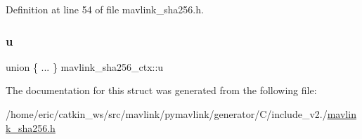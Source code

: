 Definition at line 54 of file mavlink\+\_\+sha256.\+h.

\mbox{\label{structmavlink__sha256__ctx_aac47c20ac74d2755bf35047563645135}} 
\subsubsection{\texorpdfstring{u}{u}}
{\footnotesize\ttfamily union \{ ... \}   mavlink\+\_\+sha256\+\_\+ctx\+::u}



The documentation for this struct was generated from the following file\+:\begin{DoxyCompactItemize}
\item 
/home/eric/catkin\+\_\+ws/src/mavlink/pymavlink/generator/\+C/include\+\_\+v2./\mbox{\hyperlink{mavlink__sha256_8h}{mavlink\+\_\+sha256.\+h}}\end{DoxyCompactItemize}
